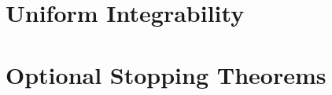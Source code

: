 \begin{theorem}

\end{theorem}

\begin{theorem}

\end{theorem}

\begin{theorem}

\end{theorem}

\section{Uniform Integrability}

\section{Optional Stopping Theorems}
